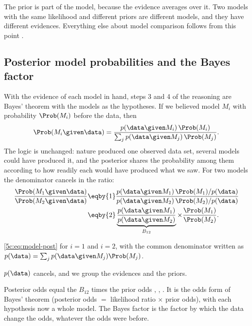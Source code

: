 The prior is part of the model, because the evidence averages over it. Two models
with the same likelihood and different priors are different models, and they have
different evidences. Everything else about model comparison follows from this point
.

\subsection{Posterior model probabilities and the Bayes factor}
\label{5c:sec:bf}

With the evidence of each model in hand, steps 3 and 4 of the reasoning are Bayes'
theorem with the models as the hypotheses. If we believed model $M_i$ with
probability $\Prob(M_i)$ before the data, then
\begin{equation}
  \Prob(M_i\given\data)
  =\frac{p(\data\given M_i)\,\Prob(M_i)}{\sum_j p(\data\given M_j)\,\Prob(M_j)} .
  \label{5c:eq:model-post}
\end{equation}
The logic is unchanged: nature produced one observed data set, several models could
have produced it, and the posterior shares the probability among them according to
how readily each would have produced what we saw. For two models the denominator
cancels in the ratio:
\begin{align}
  \frac{\Prob(M_1\given\data)}{\Prob(M_2\given\data)}
  &\eqby{1}\frac{p(\data\given M_1)\,\Prob(M_1)/p(\data)}{p(\data\given M_2)\,\Prob(M_2)/p(\data)}
   \nonumber\\
  &\eqby{2}\underbrace{\frac{p(\data\given M_1)}{p(\data\given M_2)}}_{B_{12}}
   \times\frac{\Prob(M_1)}{\Prob(M_2)} .
  \label{5c:eq:odds}
\end{align}
\begin{explain}
  \item \eqref{5c:eq:model-post} for $i=1$ and $i=2$, with the common denominator
        written as $p(\data)=\sum_j p(\data\given M_j)\Prob(M_j)$.
  \item $p(\data)$ cancels, and we group the evidences and the priors.
\end{explain}
Posterior odds equal the  $B_{12}$ times the prior odds
, ,
\cite[eqs.~(19)--(20)]{Trotta2008}. It is the odds form of Bayes' theorem
(posterior odds $=$ likelihood ratio $\times$ prior odds), with each hypothesis now a
whole model. The Bayes factor
is the factor by which the data change the odds, whatever the odds were before.

